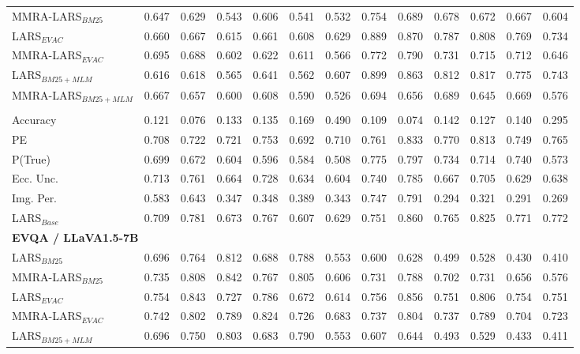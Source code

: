 \begin{table}[t]
\begin{tabular}{l|cccccc|cccccc}
MMRA-LARS$_{BM25}$ & 0.647 & 0.629 & 0.543 & 0.606 & 0.541 & 0.532 & 0.754 & 0.689 & 0.678 & 0.672 & 0.667 & 0.604 \\
LARS$_{EVAC}$ & 0.660 & 0.667 & 0.615 & 0.661 & 0.608 & 0.629 & 0.889 & 0.870 & 0.787 & 0.808 & 0.769 & 0.734 \\
MMRA-LARS$_{EVAC}$ & 0.695 & 0.688 & 0.602 & 0.622 & 0.611 & 0.566 & 0.772 & 0.790 & 0.731 & 0.715 & 0.712 & 0.646 \\
LARS$_{BM25+MLM}$ & 0.616 & 0.618 & 0.565 & 0.641 & 0.562 & 0.607 & 0.899 & 0.863 & 0.812 & 0.817 & 0.775 & 0.743 \\
MMRA-LARS$_{BM25+MLM}$ & 0.667 & 0.657 & 0.600 & 0.608 & 0.590 & 0.526 & 0.694 & 0.656 & 0.689 & 0.645 & 0.669 & 0.576 \\
\rowcolor{gray!20}\multicolumn{13}{l}{\textit{Qwen3-VL-4B}} \\
Accuracy & 0.121 & 0.076 & 0.133 & 0.135 & 0.169 & 0.490 & 0.109 & 0.074 & 0.142 & 0.127 & 0.140 & 0.295 \\
PE & 0.708 & 0.722 & 0.721 & 0.753 & 0.692 & 0.710 & 0.761 & 0.833 & 0.770 & 0.813 & 0.749 & 0.765 \\
P(True) & 0.699 & 0.672 & 0.604 & 0.596 & 0.584 & 0.508 & 0.775 & 0.797 & 0.734 & 0.714 & 0.740 & 0.573 \\
Ecc. Unc. & 0.713 & 0.761 & 0.664 & 0.728 & 0.634 & 0.604 & 0.740 & 0.785 & 0.667 & 0.705 & 0.629 & 0.638 \\
Img. Per. & 0.583 & 0.643 & 0.347 & 0.348 & 0.389 & 0.343 & 0.747 & 0.791 & 0.294 & 0.321 & 0.291 & 0.269 \\
LARS$_{Base}$ & 0.709 & 0.781 & 0.673 & 0.767 & 0.607 & 0.629 & 0.751 & 0.860 & 0.765 & 0.825 & 0.771 & 0.772 \\
\multicolumn{13}{l}{\hspace{0.3em}\textbf{EVQA / LLaVA1.5-7B}} \\
LARS$_{BM25}$ & 0.696 & 0.764 & 0.812 & 0.688 & 0.788 & 0.553 & 0.600 & 0.628 & 0.499 & 0.528 & 0.430 & 0.410 \\
MMRA-LARS$_{BM25}$ & 0.735 & 0.808 & 0.842 & 0.767 & 0.805 & 0.606 & 0.731 & 0.788 & 0.702 & 0.731 & 0.656 & 0.576 \\
LARS$_{EVAC}$ & 0.754 & 0.843 & 0.727 & 0.786 & 0.672 & 0.614 & 0.756 & 0.856 & 0.751 & 0.806 & 0.754 & 0.751 \\
MMRA-LARS$_{EVAC}$ & 0.742 & 0.802 & 0.789 & 0.824 & 0.726 & 0.683 & 0.737 & 0.804 & 0.737 & 0.789 & 0.704 & 0.723 \\
LARS$_{BM25+MLM}$ & 0.696 & 0.750 & 0.803 & 0.683 & 0.790 & 0.553 & 0.607 & 0.644 & 0.493 & 0.529 & 0.433 & 0.411 \\

\end{tabular}
\end{table}
